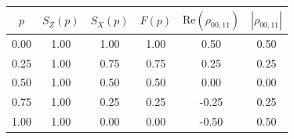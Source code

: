 \begin{tabular}{@{}cccccc@{}}
\toprule
$p$ & $S_Z(p)$ & $S_X(p)$ & $F(p)$ & $\mathrm{Re}(\rho_{00,11})$ & $|\rho_{00,11}|$\\
\midrule
0.00 & 1.00 & 1.00 & 1.00 & 0.50 & 0.50\\
0.25 & 1.00 & 0.75 & 0.75 & 0.25 & 0.25\\
0.50 & 1.00 & 0.50 & 0.50 & 0.00 & 0.00\\
0.75 & 1.00 & 0.25 & 0.25 & -0.25 & 0.25\\
1.00 & 1.00 & 0.00 & 0.00 & -0.50 & 0.50\\
\bottomrule
\end{tabular}
